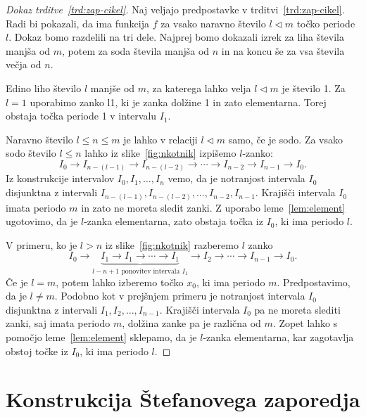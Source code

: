 \documentclass[mat2]{fmfdelo}
\begin{document}
\begin{proof}[Dokaz trditve~\ref{trd:zap-cikel}]
Naj veljajo predpostavke v trditvi~\ref{trd:zap-cikel}. Radi bi pokazali, da ima funkcija $f$ za vsako naravno število $l\triangleleft m$ točko periode $l$. Dokaz bomo razdelili na tri dele. Najprej bomo dokazali izrek za liha števila manjša od $m$, potem za soda števila manjša od $n$ in na koncu še za vsa števila večja od $n$.

Edino liho število $l$ manjše od $m$, za katerega lahko velja $l\triangleleft m$ je število 1. Za $l=1$ uporabimo zanko l1, ki je zanka dolžine 1 in zato elementarna. Torej obstaja točka periode 1 v intervalu $I_1$.

Naravno število $l \leq n \leq m$ je lahko v relaciji $l \triangleleft m$ samo, če je sodo. Za vsako sodo število $l \leq n$ lahko iz slike~\ref{fig:nkotnik} izpišemo $l$-zanko:
$$I_0\to I_{n-(l-1)} \to I_{n-(l-2)} \to \cdots \to I_{n-2} \to I_{n-1} \to I_0.$$
Iz konstrukcije intervalov $I_0, I_1, \dots, I_n$ vemo, da je notranjost intervala $I_0$ disjunktna z intervali $I_{n-(l-1)}, I_{n-(l-2)}, \dots, I_{n-2}, I_{n-1}$. Krajišči intervala $I_0$ imata periodo $m$ in zato ne moreta sledit zanki. Z uporabo leme~\ref{lem:element} ugotovimo, da je $l$-zanka elementarna, zato obstaja točka iz $I_0$, ki ima periodo $l$.

V primeru, ko je $l >n$ iz slike~\ref{fig:nkotnik} razberemo $l$ zanko
$$I_0\to\underbrace{I_1 \to I_1 \to \cdots  \to I_1}_{l - n +1 \text{ ponovitev intervala } I_1} \to I_2 \to \cdots \to I_{n-1} \to I_0.$$
Če je $l=m$, potem lahko izberemo točko $x_0$, ki ima periodo $m$. Predpostavimo, da je $l \neq m$. Podobno kot v prejšnjem primeru je notranjost intervala $I_0$ disjunktna z intervali $I_1, I_2, \dots, I_{n-1}$. Krajišči intervala $I_0$ pa ne moreta slediti zanki, saj imata periodo $m$, dolžina zanke pa je različna od $m$. Zopet lahko s pomočjo leme~\ref{lem:element} sklepamo, da je $l$-zanka elementarna, kar zagotavlja obstoj točke iz $I_0$, ki ima periodo $l$.
\end{proof}

\section{Konstrukcija Štefanovega zaporedja} \label{konssz}
\end{document}
